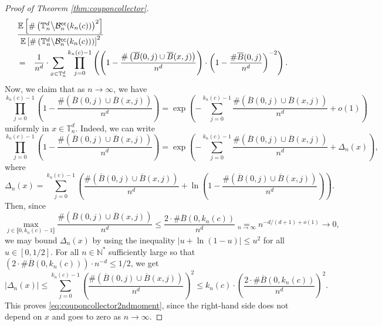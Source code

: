 \documentclass[a4paper,11pt]{article}
\begin{document}
\begin{proof}[Proof of Theorem \ref{thm:couponcollector}]
\begin{eqnarray*}
\lefteqn{\frac{\mathbb{E}\left[\#\left(\mathbb{T}_n^d\middle\backslash\mathcal{B}_n^\mathsf{cc}(k_n(c))\right)^2\right]}{\mathbb{E}\left[\#\left(\mathbb{T}_n^d\middle\backslash\mathcal{B}_n^\mathsf{cc}(k_n(c))\right)\right]^2}}\\
&=&\frac{1}{n^d}\cdot\sum_{x\in\mathbb{T}_n^d}\prod_{j=0}^{k_n(c)-1}\left(\left(1-\frac{\#\left(\overline{B}(0,j)\cup\overline{B}(x,j)\right)}{n^d}\right)\cdot\left(1-\frac{\#\overline{B}(0,j)}{n^d}\right)^{-2}\right).
\end{eqnarray*}
Now, we claim that as $n\to\infty$, we have
\begin{equation}\label{eq:couponcollector2ndmoment}
\prod_{j=0}^{k_n(c)-1}\left(1-\frac{\#\left(\overline{B}(0,j)\cup\overline{B}(x,j)\right)}{n^d}\right)=\exp\left(-\sum_{j=0}^{k_n(c)-1}\frac{\#\left(\overline{B}(0,j)\cup\overline{B}(x,j)\right)}{n^d}+o(1)\right)
\end{equation}
uniformly in $x\in\mathbb{T}_n^d$.
Indeed, we can write
\[\prod_{j=0}^{k_n(c)-1}\left(1-\frac{\#\left(\overline{B}(0,j)\cup\overline{B}(x,j)\right)}{n^d}\right)=\exp\left(-\sum_{j=0}^{k_n(c)-1}\frac{\#\left(\overline{B}(0,j)\cup\overline{B}(x,j)\right)}{n^d}+\Delta_n(x)\right),\]
where
\[\Delta_n(x)=\sum_{j=0}^{k_n(c)-1}\left(\frac{\#\left(\overline{B}(0,j)\cup\overline{B}(x,j)\right)}{n^d}+\ln\left(1-\frac{\#\left(\overline{B}(0,j)\cup\overline{B}(x,j)\right)}{n^d}\right)\right).\]
Then, since
\[\max_{j\in\llbracket0,k_n(c)-1\rrbracket}\frac{\#\left(\overline{B}(0,j)\cup\overline{B}(x,j)\right)}{n^d}\leq\frac{2\cdot\#\overline{B}(0,k_n(c))}{n^d}\underset{n\to\infty}{=}n^{-d/(d+1)+o(1)}\longrightarrow0,\]
we may bound $\Delta_n(x)$ by using the inequality $|u+\ln(1-u)|\leq u^2$ for all $u\in[0,1/2]$.
For all $n\in\mathbb{N}^*$ sufficiently large so that $\left(2\cdot\#\overline{B}(0,k_n(c))\right)\cdot n^{-d}\leq1/2$, we get
\[|\Delta_n(x)|\leq\sum_{j=0}^{k_n(c)-1}\left(\frac{\#\left(\overline{B}(0,j)\cup\overline{B}(x,j)\right)}{n^d}\right)^2\leq k_n(c)\cdot\left(\frac{2\cdot\#\overline{B}(0,k_n(c))}{n^d}\right)^2.\]
This proves \eqref{eq:couponcollector2ndmoment}, since the right-hand side does not depend on $x$ and goes to zero as $n\to\infty$.


\end{proof}
\end{document}
